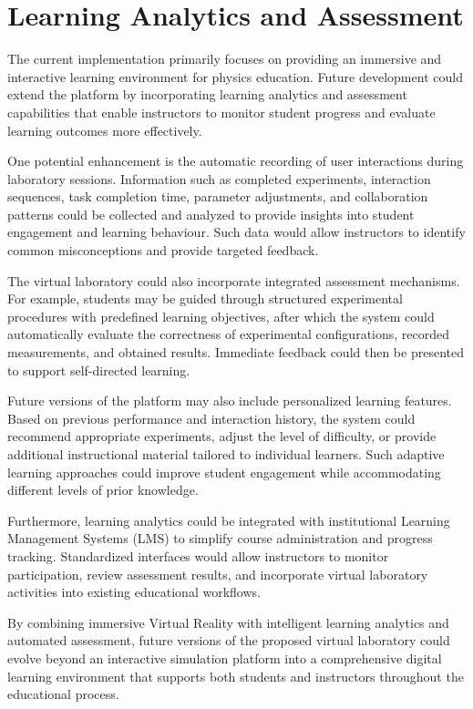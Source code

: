\section{Learning Analytics and Assessment}

The current implementation primarily focuses on providing an immersive and interactive learning environment for physics education. Future development could extend the platform by incorporating learning analytics and assessment capabilities that enable instructors to monitor student progress and evaluate learning outcomes more effectively.

One potential enhancement is the automatic recording of user interactions during laboratory sessions. Information such as completed experiments, interaction sequences, task completion time, parameter adjustments, and collaboration patterns could be collected and analyzed to provide insights into student engagement and learning behaviour. Such data would allow instructors to identify common misconceptions and provide targeted feedback.

The virtual laboratory could also incorporate integrated assessment mechanisms. For example, students may be guided through structured experimental procedures with predefined learning objectives, after which the system could automatically evaluate the correctness of experimental configurations, recorded measurements, and obtained results. Immediate feedback could then be presented to support self-directed learning.

Future versions of the platform may also include personalized learning features. Based on previous performance and interaction history, the system could recommend appropriate experiments, adjust the level of difficulty, or provide additional instructional material tailored to individual learners. Such adaptive learning approaches could improve student engagement while accommodating different levels of prior knowledge.

Furthermore, learning analytics could be integrated with institutional Learning Management Systems (LMS) to simplify course administration and progress tracking. Standardized interfaces would allow instructors to monitor participation, review assessment results, and incorporate virtual laboratory activities into existing educational workflows.

By combining immersive Virtual Reality with intelligent learning analytics and automated assessment, future versions of the proposed virtual laboratory could evolve beyond an interactive simulation platform into a comprehensive digital learning environment that supports both students and instructors throughout the educational process.